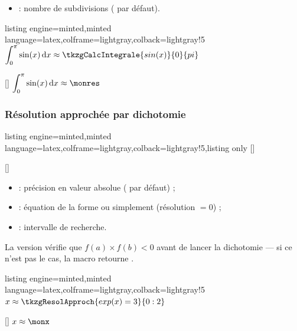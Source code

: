 \documentclass[11pt,a4paper]{ltxdoc}
\begin{document}
\begin{itemize}
  \item \MontreCode{[N]} : nombre de subdivisions ( par défaut).
\end{itemize}

\begin{tcblisting}{listing engine=minted,minted language=latex,colframe=lightgray,colback=lightgray!5}
$\displaystyle\int_0^{\pi} \sin(x)\,\mathrm{d}x \approx \tkzgCalcIntegrale{sin(x)}{0}{pi}$

[\monres]
$\displaystyle\int_0^{\pi} \sin(x)\,\mathrm{d}x \approx \monres$
\end{tcblisting}

\subsubsection{Résolution approchée par dichotomie}

\begin{tcblisting}{listing engine=minted,minted language=latex,colframe=lightgray,colback=lightgray!5,listing only}
[\macro]

[\macro]
\end{tcblisting}

\begin{itemize}
  \item \MontreCode{[precision]} : précision en valeur absolue ( par défaut) ;
  \item {} : équation de la forme  ou simplement  (résolution $=0$) ;
  \item {} : intervalle de recherche.
\end{itemize}

La version  vérifie que $f(a) \times f(b)<0$ avant de lancer la dichotomie — si ce n'est pas le cas, la macro retourne .

\begin{tcblisting}{listing engine=minted,minted language=latex,colframe=lightgray,colback=lightgray!5}
$x \approx \tkzgResolApproch{exp(x)=3}{0:2}$

[\monx]
$x \approx \monx$
\end{tcblisting}
\end{document}
